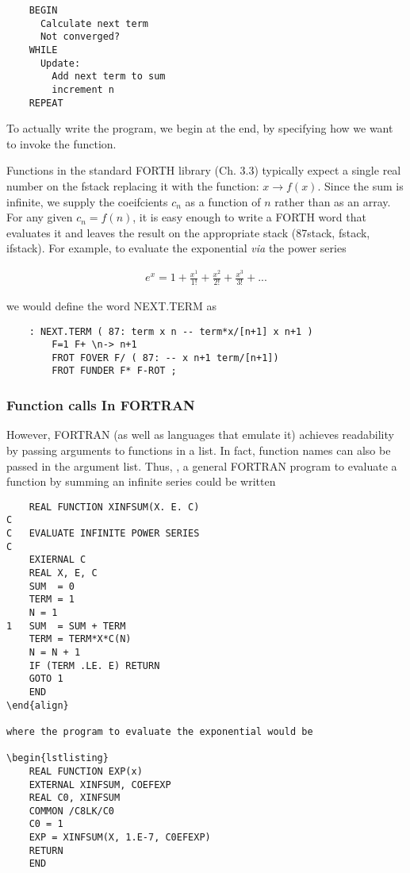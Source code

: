 \begin{lstlisting}
    BEGIN
      Calculate next term
      Not converged?
    WHILE
      Update:
        Add next term to sum
        increment n
    REPEAT
\end{lstlisting}

To actually write the program, we begin at the end, by specifying how we want to invoke the function.

Functions in the standard FORTH library (Ch. 3.3) typically expect a single real number on the fstack replacing it with the function: $x \rightarrow f(x)$. Since the sum is infinite, we supply the coeifcients $c_n$ as a function of $n$ rather than as an array. For any given $c_n=f(n)$, it is easy enough to write a FORTH word that evaluates it and leaves the result on the appropriate stack (87stack, fstack, ifstack). For example, to evaluate the exponential \textit{via} the power series

\begin{align}
e^x = 1 + \frac{x^1}{1!} + \frac{x^2}{2!} + \frac{x^3}{3!} + ...
\end{align}

we would define the word NEXT.TERM as

\begin{lstlisting}
    : NEXT.TERM ( 87: term x n -- term*x/[n+1] x n+1 )
        F=1 F+ \n-> n+1
        FROT FOVER F/ ( 87: -- x n+1 term/[n+1])
        FROT FUNDER F* F-ROT ;
\end{lstlisting}

\subsubsection{Function calls In FORTRAN}
However, FORTRAN (as well as languages that emulate it) achieves readability by passing arguments to functions in a list. In fact, function names can also be passed in the argument list. Thus, \eg, a general FORTRAN program to evaluate a function by summing an infinite series could be written

\begin{lstlisting}
    REAL FUNCTION XINFSUM(X. E. C)
C
C   EVALUATE INFINITE POWER SERIES
C
    EXIERNAL C
    REAL X, E, C
    SUM  = 0
    TERM = 1
    N = 1
1   SUM  = SUM + TERM
    TERM = TERM*X*C(N)
    N = N + 1
    IF (TERM .LE. E) RETURN
    GOTO 1
    END
\end{align}

where the program to evaluate the exponential would be

\begin{lstlisting}
    REAL FUNCTION EXP(x)
    EXTERNAL XINFSUM, COEFEXP
    REAL C0, XINFSUM
    COMMON /C8LK/C0
    C0 = 1
    EXP = XINFSUM(X, 1.E-7, C0EFEXP)
    RETURN
    END
\end{lstlisting}

